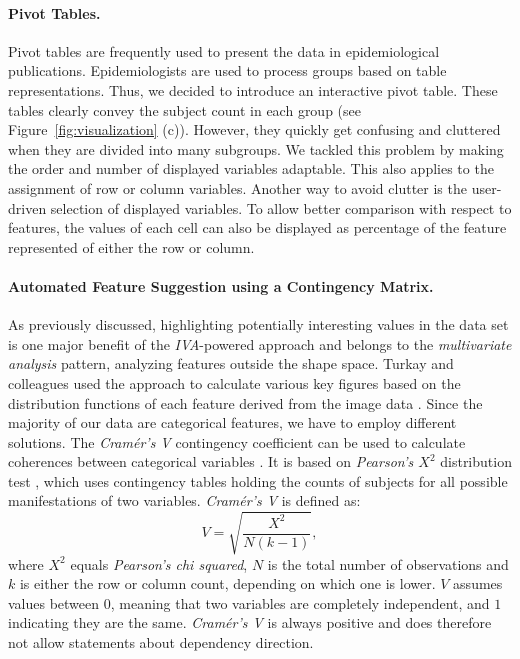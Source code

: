 \documentclass[journal]{style/vgtc} 			          %
\begin{document}
\paragraph{Pivot Tables.}
Pivot tables are frequently used to present the data in epidemiological publications.
%
Epidemiologists are used to process groups based on table representations.
%
Thus, we decided to introduce an interactive pivot table.
%
These tables clearly convey the subject count in each group (see Figure~\ref{fig:visualization} (c)).
%
However, they quickly get confusing and cluttered when they are divided into many subgroups.
%
We tackled this problem by making the order and number of displayed variables adaptable.
%
This also applies to the assignment of row or column variables.
%
Another way to avoid clutter is the user-driven selection of displayed variables.
%
To allow better comparison with respect to features, the values of each cell can also be displayed as percentage of the feature represented of either the row or column.

\paragraph{Automated Feature Suggestion using a Contingency Matrix.}
As previously discussed, highlighting potentially interesting values in the data set is one major benefit of the \emph{IVA}-powered approach and belongs to the \emph{multivariate analysis} pattern,  analyzing features outside the shape space.
%
Turkay and colleagues used the approach to calculate various key figures based on the distribution functions of each feature derived from the image data \cite{Turkay2013}.
%
Since the majority of our data are categorical features, we have to employ different solutions.
%
The \emph{Cram\'{e}r's V} contingency coefficient can be used to calculate coherences between categorical variables \cite{CramerV}.
%
It is based on \emph{Pearson's $X^2$} distribution test \cite{ChiSquare}, which uses contingency tables holding the counts of subjects for all possible manifestations of two variables.
%
\emph{Cram\'{e}r's V} is defined as:
\begin{equation}
V = \sqrt{\frac{X^2}{N(k-1)}},
\end{equation}
where $X^2$ equals \emph{Pearson's chi squared}, $N$ is the total number of observations and $k$ is either the row or column count, depending on which one is lower.
%
$V$ assumes values between $0$, meaning that two variables are completely independent, and $1$ indicating they are the same.
%
\emph{Cram\'{e}r's V} is always positive and does therefore not allow statements about dependency direction.
\end{document}

